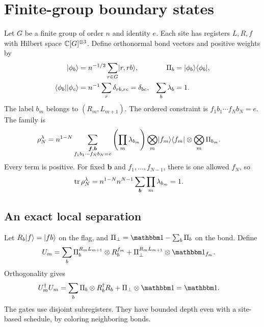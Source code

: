 \section{Finite-group boundary states}
\label{sec:intrinsic-groups}

Let $G$ be a finite group of order $n$ and identity $e$. Each site
has registers $L,R,f$ with Hilbert space $\mathbb{C}[G]^{\otimes3}$.
Define orthonormal bond vectors and positive weights by
\begin{align}
	\lvert\phi_b\rangle
	                & =n^{-1/2}\sum_{r\in G}\lvert r,rb\rangle,        &
	\Pi_b           & =\lvert\phi_b\rangle\langle\phi_b\rvert,                 \\
	\langle\phi_b\rvert\lvert\phi_c\rangle
	                & =n^{-1}\sum_r\delta_{rb,rc}=\delta_{bc}, &
	\sum_b\lambda_b & =1.
\end{align}
The label $b_m$ belongs to $(R_m,L_{m+1})$. The ordered constraint
is $f_1b_1\cdots f_Nb_N=e$. The family is
\begin{align}
	\rho_N^\lambda
	 & =n^{1-N}
	\sum_{\substack{\boldsymbol f,\boldsymbol b\\
			f_1b_1\cdots f_Nb_N=e}}
	\left(\prod_m\lambda_{b_m}\right)
	\bigotimes_m\lvert f_m\rangle\langle f_m\rvert
	\otimes\bigotimes_m\Pi_{b_m}.
	\label{eq:group-state}
\end{align}
Every term is positive. For fixed $\boldsymbol b$ and
$f_1,\ldots,f_{N-1}$, there is one allowed $f_N$, so
\begin{align}
	\operatorname{tr}\rho_N^\lambda
	 & =n^{1-N}n^{N-1}
	\sum_{\boldsymbol b}\prod_m\lambda_{b_m}=1.
\end{align}

\subsection{An exact local separation}

Let $R_b\lvert f\rangle=\lvert fb\rangle$ on the flag, and
$\Pi_\perp=\Id-\sum_b\Pi_b$ on the bond. Define
\begin{align}
	U_m
	 & =\sum_b\Pi_b^{R_mL_{m+1}}\otimes R_b^{f_m}
	+\Pi_\perp^{R_mL_{m+1}}\otimes\Id_{f_m}.
	\label{eq:group-gate}
\end{align}
Orthogonality gives
\begin{align}
	U_m^\dagger U_m
	 & =\sum_b\Pi_b\otimes R_b^\dagger R_b
	+\Pi_\perp\otimes\Id
	=\Id.
\end{align}
The gates use disjoint subregisters. They have bounded depth even
with a site-based schedule, by coloring neighboring bonds.

